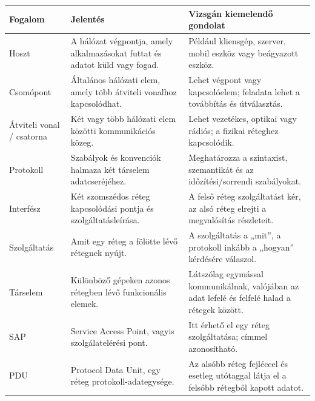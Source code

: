 \begin{tabularx}{\textwidth}{L{32mm}X X}
\toprule
\textbf{Fogalom} & \textbf{Jelentés} & \textbf{Vizsgán kiemelendő gondolat} \\
\midrule
Hoszt & A hálózat végpontja, amely alkalmazásokat futtat és adatot küld vagy fogad. & Például kliensgép, szerver, mobil eszköz vagy beágyazott eszköz. \\
Csomópont & Általános hálózati elem, amely több átviteli vonalhoz kapcsolódhat. & Lehet végpont vagy kapcsolóelem; feladata lehet a továbbítás és útválasztás. \\
Átviteli vonal / csatorna & Két vagy több hálózati elem közötti kommunikációs közeg. & Lehet vezetékes, optikai vagy rádiós; a fizikai réteghez kapcsolódik. \\
Protokoll & Szabályok és konvenciók halmaza két társelem adatcseréjéhez. & Meghatározza a szintaxist, szemantikát és az időzítési/sorrendi szabályokat. \\
Interfész & Két szomszédos réteg kapcsolódási pontja és szolgáltatásleírása. & A felső réteg szolgáltatást kér, az alsó réteg elrejti a megvalósítás részleteit. \\
Szolgáltatás & Amit egy réteg a fölötte lévő rétegnek nyújt. & A szolgáltatás a „mit”, a protokoll inkább a „hogyan” kérdésére válaszol. \\
Társelem & Különböző gépeken azonos rétegben lévő funkcionális elemek. & Látszólag egymással kommunikálnak, valójában az adat lefelé és felfelé halad a rétegek között. \\
SAP & Service Access Point, vagyis szolgálatelérési pont. & Itt érhető el egy réteg szolgáltatása; címmel azonosítható. \\
PDU & Protocol Data Unit, egy réteg protokoll-adategysége. & Az alsóbb réteg fejléccel és esetleg utótaggal látja el a felsőbb rétegből kapott adatot. \\
\bottomrule
\end{tabularx}

